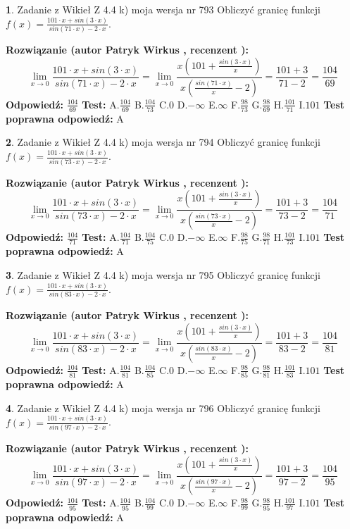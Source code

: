 \documentclass[12pt, a4paper]{article}
\theoremstyle{definition} %
\newtheorem{zad}{}
\newcommand{\zadStart}[1]{\begin{zad}#1\newline}
\newcommand{\zadStop}{\end{zad}}
\newcommand{\rozwStart}[2]{\noindent \textbf{Rozwiązanie (autor #1 , recenzent #2): }\newline}
\newcommand{\rozwStop}{\newline}
\newcommand{\odpStart}{\noindent \textbf{Odpowiedź:}\newline}
\newcommand{\odpStop}{\newline}
\newcommand{\testStart}{\noindent \textbf{Test:}\newline}
\newcommand{\testStop}{\newline}
\newcommand{\kluczStart}{\noindent \textbf{Test poprawna odpowiedź:}\newline}
\newcommand{\kluczStop}{\newline}
\begin{document}
\zadStart{Zadanie z Wikieł Z 4.4 k) moja wersja nr 793}
Obliczyć granicę funkcji $f(x)=\frac{101\cdot x +sin(3\cdot x)}{sin(71\cdot x) -2\cdot x}$.
\zadStop
\rozwStart{Patryk Wirkus}{}
$$\lim\limits_{x\to 0}\frac{101\cdot x +sin(3\cdot x)}{sin(71\cdot x) -2\cdot x}
=\lim\limits_{x\to 0}\frac{x(101+\frac{sin(3\cdot x)}{x})}{x(\frac{sin(71\cdot x)}{x}-2)}
=\frac{101+3}{71-2} = \frac{104}{69}$$
\rozwStop
\odpStart
$\frac{104}{69}$
\odpStop
\testStart
A.$\frac{104}{69}$
B.$\frac{104}{73}$
C.$0$
D.$-\infty$
E.$\infty$
F.$\frac{98}{73}$
G.$\frac{98}{69}$
H.$\frac{101}{71}$
I.$101$
\testStop
\kluczStart
A
\kluczStop



\zadStart{Zadanie z Wikieł Z 4.4 k) moja wersja nr 794}
Obliczyć granicę funkcji $f(x)=\frac{101\cdot x +sin(3\cdot x)}{sin(73\cdot x) -2\cdot x}$.
\zadStop
\rozwStart{Patryk Wirkus}{}
$$\lim\limits_{x\to 0}\frac{101\cdot x +sin(3\cdot x)}{sin(73\cdot x) -2\cdot x}
=\lim\limits_{x\to 0}\frac{x(101+\frac{sin(3\cdot x)}{x})}{x(\frac{sin(73\cdot x)}{x}-2)}
=\frac{101+3}{73-2} = \frac{104}{71}$$
\rozwStop
\odpStart
$\frac{104}{71}$
\odpStop
\testStart
A.$\frac{104}{71}$
B.$\frac{104}{75}$
C.$0$
D.$-\infty$
E.$\infty$
F.$\frac{98}{75}$
G.$\frac{98}{71}$
H.$\frac{101}{73}$
I.$101$
\testStop
\kluczStart
A
\kluczStop



\zadStart{Zadanie z Wikieł Z 4.4 k) moja wersja nr 795}
Obliczyć granicę funkcji $f(x)=\frac{101\cdot x +sin(3\cdot x)}{sin(83\cdot x) -2\cdot x}$.
\zadStop
\rozwStart{Patryk Wirkus}{}
$$\lim\limits_{x\to 0}\frac{101\cdot x +sin(3\cdot x)}{sin(83\cdot x) -2\cdot x}
=\lim\limits_{x\to 0}\frac{x(101+\frac{sin(3\cdot x)}{x})}{x(\frac{sin(83\cdot x)}{x}-2)}
=\frac{101+3}{83-2} = \frac{104}{81}$$
\rozwStop
\odpStart
$\frac{104}{81}$
\odpStop
\testStart
A.$\frac{104}{81}$
B.$\frac{104}{85}$
C.$0$
D.$-\infty$
E.$\infty$
F.$\frac{98}{85}$
G.$\frac{98}{81}$
H.$\frac{101}{83}$
I.$101$
\testStop
\kluczStart
A
\kluczStop



\zadStart{Zadanie z Wikieł Z 4.4 k) moja wersja nr 796}
Obliczyć granicę funkcji $f(x)=\frac{101\cdot x +sin(3\cdot x)}{sin(97\cdot x) -2\cdot x}$.
\zadStop
\rozwStart{Patryk Wirkus}{}
$$\lim\limits_{x\to 0}\frac{101\cdot x +sin(3\cdot x)}{sin(97\cdot x) -2\cdot x}
=\lim\limits_{x\to 0}\frac{x(101+\frac{sin(3\cdot x)}{x})}{x(\frac{sin(97\cdot x)}{x}-2)}
=\frac{101+3}{97-2} = \frac{104}{95}$$
\rozwStop
\odpStart
$\frac{104}{95}$
\odpStop
\testStart
A.$\frac{104}{95}$
B.$\frac{104}{99}$
C.$0$
D.$-\infty$
E.$\infty$
F.$\frac{98}{99}$
G.$\frac{98}{95}$
H.$\frac{101}{97}$
I.$101$
\testStop
\kluczStart
A
\kluczStop
\end{document}
